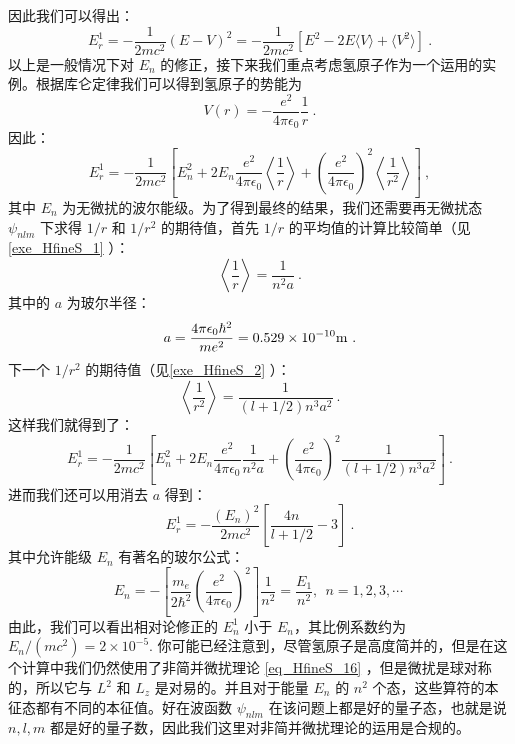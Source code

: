 因此我们可以得出：
\begin{equation}
E_r^1=-\frac{1}{2mc^2}(E-V)^2=-\frac{1}{2mc^2}[E^2-2E\langle V\rangle+\langle V^2\rangle]~.
\end{equation}
以上是一般情况下对 $E_n$ 的修正，接下来我们重点考虑氢原子作为一个运用的实例。根据库仑定律我们可以得到氢原子的势能为
\begin{equation}
V(r)=-\frac{e^2}{4\pi\epsilon_0}\frac{1}{r}~.
\end{equation}
因此：
\begin{equation}
E_r^1=-\frac{1}{2mc^2}\left[E_n^2+2E_n\frac{e^2}{4\pi\epsilon_0}\left\langle \frac{1}{r}\right\rangle+\left(\frac{e^2}{4\pi\epsilon_0}\right)^2\left\langle \frac{1}{r^2}\right\rangle\right]~,
\end{equation}
其中 $E_n$ 为无微扰的波尔能级。为了得到最终的结果，我们还需要再无微扰态 $\psi_{nlm}$ 下求得 $1/r$ 和 $1/r^2$ 的期待值，首先 $1/r$ 的平均值的计算比较简单（见\autoref{exe_HfineS_1} ）：
\begin{equation}
\left\langle\frac{1}{r}\right\rangle = \frac{1}{n^2a}~.
\end{equation}
其中的 $a$ 为玻尔半径：
\begin{equation}
a=\frac{4\pi\epsilon_0\hbar^2}{me^2}=0.529\times 10^{-10}\rm{m}~.
\end{equation}
下一个 $1/r^2$ 的期待值（见\autoref{exe_HfineS_2} ）：
\begin{equation}
\left\langle \frac{1}{r^2}\right\rangle = \frac{1}{(l+1/2)n^3a^2}~.
\end{equation}
这样我们就得到了：
\begin{equation}
E_r^1=-\frac{1}{2mc^2}\left[E_n^2+2E_n\frac{e^2}{4\pi\epsilon_0}\frac{1}{n^2a}+\left(\frac{e^2}{4\pi\epsilon_0}\right)^2\frac{1}{(l+1/2)n^3a^2}\right]~.
\end{equation}
进而我们还可以用消去 $a$ 得到：
\begin{equation}\label{eq_HfineS_21}
E_r^1=-\frac{(E_n)^2}{2mc^2}\left[\frac{4n}{l+1/2}-3\right]~.
\end{equation}
其中允许能级 $E_n$ 有著名的玻尔公式：
\begin{equation}
E_{n} =-\left[\frac {m_e}{2\hbar^{2}} \left(\frac {e^ {2}}{4\pi \epsilon_0}\right)^ {2}\right]  \frac {1}{n^ {2}}  =  \frac {E_ {1}}{n^ {2}}, \ \  n=1,2,3, \cdots ~
\end{equation}
由此，我们可以看出相对论修正的 $E^1_n$ 小于 $E_n$，其比例系数约为 $E_n/(mc^2)=2\times 10^{-5}$.
你可能已经注意到，尽管氢原子是高度简并的，但是在这个计算中我们仍然使用了非简并微扰理论 \autoref{eq_HfineS_16} ，但是微扰是球对称的，所以它与 $L^2$ 和 $L_z$ 是对易的。并且对于能量 $E_n$ 的 $n^2$ 个态，这些算符的本征态都有不同的本征值。好在波函数 $\psi_{nlm}$ 在该问题上都是好的量子态，也就是说 $n,l,m$ 都是好的量子数，因此我们这里对非简并微扰理论的运用是合规的。

